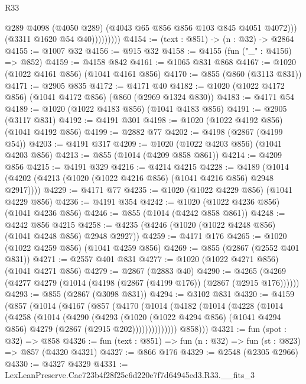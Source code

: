\begin{lexlean}{R33}
\begin{coremodule}
                        @289
                        @4098
                        (@4050 @289)
                        (@4043 @65 @856 @856 @103 @845 @4051 @4072)))
                    (@3311 @1620 @54 @40)))))))))
@4154 := (text : @851) -> (n : @32) -> @2864
@4155 := @1007 @32
@4156 := @915 @32
@4158 := @4155 (fun ("_" : @4156) => @852)
@4159 := @4158 @842
@4161 := @1065 @831 @868
@4167 := @1020 (@1022 @4161 @856) (@1041 @4161 @856)
@4170 := @855 (@860 (@3113 @831))
@4171 := @2905 @835
@4172 := @4171 @40
@4182 := @1020 (@1022 @4172 @856) (@1041 @4172 @856) (@860 (@2969 @1324 @830))
@4183 := @4171 @54
@4189 := @1020 (@1022 @4183 @856) (@1041 @4183 @856)
@4191 := @2905 (@3117 @831)
@4192 := @4191 @301
@4198 := @1020 (@1022 @4192 @856) (@1041 @4192 @856)
@4199 := @2882 @77
@4202 := @4198 (@2867 (@4199 @54))
@4203 := @4191 @317
@4209 := @1020 (@1022 @4203 @856) (@1041 @4203 @856)
@4213 := @855 (@1014 (@4209 @858 @861))
@4214 := @4209 @856
@4215 := @4191 @329
@4216 := @4214 @4215
@4228 := @4189 (@1014 (@4202 (@4213 (@1020 (@1022 @4216 @856) (@1041 @4216 @856) @2948 @2917))))
@4229 := @4171 @77
@4235 := @1020 (@1022 @4229 @856) (@1041 @4229 @856)
@4236 := @4191 @354
@4242 := @1020 (@1022 @4236 @856) (@1041 @4236 @856)
@4246 := @855 (@1014 (@4242 @858 @861))
@4248 := @4242 @856 @4215
@4258 := @4235 (@4246 (@1020 (@1022 @4248 @856) (@1041 @4248 @856) @2948 @2927))
@4259 := @4171 @176
@4265 := @1020 (@1022 @4259 @856) (@1041 @4259 @856)
@4269 := @855 (@2867 (@2552 @401 @831))
@4271 := @2557 @401 @831
@4277 := @1020 (@1022 @4271 @856) (@1041 @4271 @856)
@4279 := @2867 (@2883 @40)
@4290 := @4265 (@4269 (@4277 @4279 (@1014 (@4198 (@2867 (@4199 @176)) (@2867 (@2915 @176))))))
@4293 := @855 (@2867 (@3098 @831))
@4294 := @3102 @831
@4320 := @4159
    (@857
      (@1014
        (@4167
          (@857
            (@4170
              (@1014
                (@4182
                  (@1014
                    (@4228
                      (@1014
                        (@4258
                          (@1014
                            (@4290
                              (@4293
                                (@1020
                                  (@1022 @4294 @856)
                                  (@1041 @4294 @856)
                                  @4279
                                  (@2867 (@2915 @202))))))))))))))
          @858)))
@4321 := fun (spot : @32) => @858
@4326 := fun (text : @851) => fun (n : @32) => fun (st : @823) => @857 (@4320 @4321)
@4327 := @866 @176
@4329 := @2548 (@2305 @2966)
@4330 := @4327 @4329
@4331 := LexLeanPreserve.Cae723b4f28f25c6d220e7f7d64945ed3.R33.__fits_3

\end{coremodule}
\end{lexlean}
